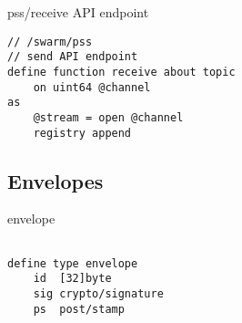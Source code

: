 \begin{definition}{pss/receive API endpoint}\label{def:receive}
\begin{lstlisting}[language=buzz1]
// /swarm/pss
// send API endpoint
define function receive about topic 
    on uint64 @channel
as 
    @stream = open @channel
    registry append 
\end{lstlisting}
\end{definition}

\subsection{Envelopes}

\begin{definition}{envelope}\label{def:pss-envelope}
\begin{lstlisting}[language=buzz1]

define type envelope
    id  [32]byte
    sig crypto/signature
    ps  post/stamp   
    
\end{lstlisting}
\end{definition}
